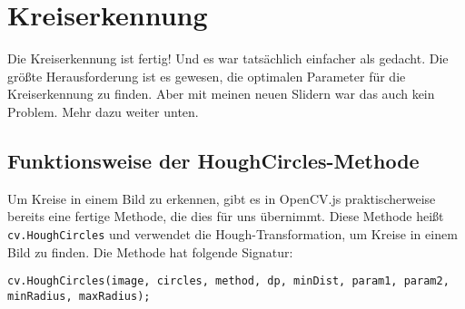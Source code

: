 \section{Kreiserkennung}
Die Kreiserkennung ist fertig! Und es war tatsächlich einfacher als gedacht. Die größte Herausforderung ist es gewesen, die optimalen Parameter für die Kreiserkennung zu finden. Aber mit meinen neuen Slidern war das auch kein Problem. Mehr dazu weiter unten.

\subsection{Funktionsweise der HoughCircles-Methode}
Um Kreise in einem Bild zu erkennen, gibt es in OpenCV.js praktischerweise bereits eine fertige Methode, die dies für uns übernimmt. Diese Methode heißt \texttt{cv.HoughCircles} und verwendet die Hough-Transformation, um Kreise in einem Bild zu finden. Die Methode hat folgende Signatur:

\begin{lstlisting}[style=JavaScript]
cv.HoughCircles(image, circles, method, dp, minDist, param1, param2, minRadius, maxRadius);
\end{lstlisting}

